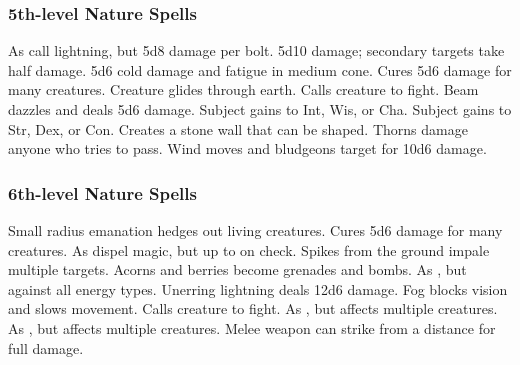 \subsubsection{5th-level Nature Spells}
\begin{spelllist}
     As call lightning, but 5d8 damage per bolt.
     5d10 damage; secondary targets take half damage.
     5d6 cold damage and fatigue in medium cone.
     Cures 5d6 damage for many creatures.
     Creature glides through earth. 
     Calls creature to fight.
     Beam dazzles and deals 5d6 damage.
     Subject gains  to Int, Wis, or Cha.
     Subject gains  to Str, Dex, or Con.
     Creates a stone wall that can be shaped.
     Thorns damage anyone who tries to pass.
     Wind moves and bludgeons target for 10d6 damage.
\end{spelllist}

\subsubsection{6th-level Nature Spells}
\begin{spelllist}
     Small radius emanation hedges out living creatures.
     Cures 5d6 damage for many creatures.
     As dispel magic, but up to  on check.
     Spikes from the ground impale multiple targets.
     Acorns and berries become grenades and bombs.
     As , but against all energy types.
     Unerring lightning deals 12d6 damage.
     Fog blocks vision and slows movement.
     Calls creature to fight.
     As , but affects multiple creatures.
     As , but affects multiple creatures.
     Melee weapon can strike from a distance for full damage.
\end{spelllist}

